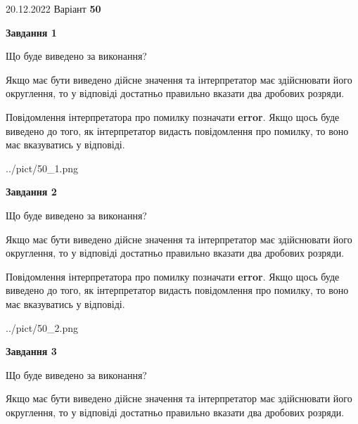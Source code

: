 \documentclass[12pt, ukrainian]{article}
\begin{document}
{20.12.2022 Варіант \No \textbf { 50 }\par}
{
\begin {Large}

{\begin {center}\textbf{Завдання 1}\end {center}}\par
Що буде виведено за виконання? \par

Якщо має бути виведено дійсне значення та інтерпретатор має здійснювати його округлення, 
то у відповіді достатньо правильно вказати два дробових розряди.

Повідомлення інтерпретатора про помилку позначати \textbf{error}.
Якщо щось буде виведено до того, як інтерпретатор видасть повідомлення про помилку, 
то воно має вказуватись у відповіді. \par

\begin{center}
	{../pict/50_1.png}
\end{center}
\newpage

{\begin {center}\textbf{Завдання 2}\end {center}}\par
Що буде виведено за виконання? \par

Якщо має бути виведено дійсне значення та інтерпретатор має здійснювати його округлення, 
то у відповіді достатньо правильно вказати два дробових розряди.

Повідомлення інтерпретатора про помилку позначати \textbf{error}.
Якщо щось буде виведено до того, як інтерпретатор видасть повідомлення про помилку, 
то воно має вказуватись у відповіді. \par

\begin{center}
	{../pict/50_2.png}
\end{center}
\newpage

{\begin {center}\textbf{Завдання 3}\end {center}}\par
Що буде виведено за виконання? \par

Якщо має бути виведено дійсне значення та інтерпретатор має здійснювати його округлення, 
то у відповіді достатньо правильно вказати два дробових розряди.


\end{Large}}
\end{document}
